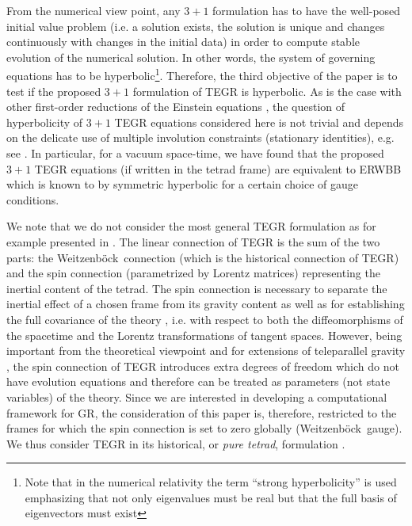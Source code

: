\documentclass[
10pt, %
a4paper, %
oneside, %
twocolumn,
headinclude,footinclude, %
BCOR5mm, %
]{scrartcl}
\newcommand{\We}{Weitzenb\"ock}
\begin{document}
	From the numerical view point, any $ 3+1 $ formulation has to have the
	well-posed initial value problem (i.e. a solution exists, the solution is
	unique and changes continuously with changes in the initial data) in order
	to compute stable evolution of the numerical solution. In other words, the
	system of governing equations has to be hyperbolic\footnote{Note that in the
	numerical relativity the term ``strong hyperbolicity'' is used emphasizing
	that not only eigenvalues must be real but that the full basis of
	eigenvectors must exist}. Therefore, the third objective of the paper is to
	test if the proposed $ 3+1 $ formulation of TEGR is hyperbolic. As is the
	case with other first-order reductions of the Einstein equations
	\cite{Baumgarte2003a}, the question of hyperbolicity of $ 3+1 $ TEGR
	equations considered here is not trivial and depends on the delicate use of
	multiple involution constraints (stationary identities), e.g. see
	\cite{FO-CCZ4}. In particular, for a vacuum space-time, we have found that
	the proposed $ 3+1 $ TEGR equations (if written in the tetrad frame) are
	equivalent to ERWBB \cite{Estabrook1997,Buchman2003} which is known to by
	symmetric hyperbolic for a certain choice of gauge conditions.
	
	We note that we do not consider the most general TEGR formulation as for
	example presented in \cite{AldrovandiPereiraBook}. The linear connection of
	TEGR is the sum of the two parts: the \We\ connection (which is the
	historical connection of TEGR) and the spin connection (parametrized by
	Lorentz matrices) representing the inertial content of the tetrad. The spin
	connection is necessary to separate the inertial effect of a chosen frame
	from its gravity content as well as for establishing the full covariance of
	the theory \cite{AldrovandiPereiraBook,Golovnev2017a,Krssak2019}, i.e. with
	respect to both the diffeomorphisms of the spacetime and the Lorentz
	transformations of tangent spaces. However, being important from the
	theoretical viewpoint and for extensions of teleparallel gravity
	\cite{Golovnev2017a}, the spin connection of TEGR introduces extra degrees
	of freedom which do not have evolution equations and therefore can be
	treated as parameters (not state variables) of the theory. Since we are
	interested in developing a computational framework for GR, the consideration
	of this paper is, therefore, restricted to the frames for which the spin
	connection is set to zero globally (\We\ gauge). We thus consider TEGR in
	its historical, or \emph{pure tetrad}, formulation \cite{Golovnev2017a}.
	
\end{document}
